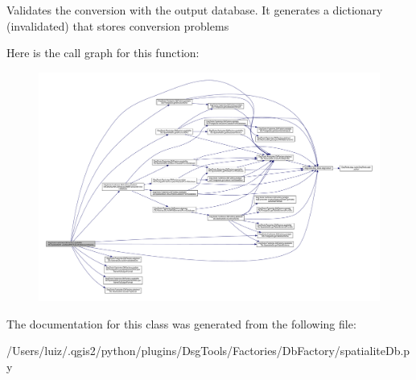 \begin{DoxyVerb}Validates the conversion with the output database.
It generates a dictionary (invalidated) that stores conversion problems
\end{DoxyVerb}
 Here is the call graph for this function\+:
\nopagebreak
\begin{figure}[H]
\begin{center}
\leavevmode
\includegraphics[width=350pt]{class_dsg_tools_1_1_factories_1_1_db_factory_1_1spatialite_db_1_1_spatialite_db_ae6063c531bf964bc1ffb392c2324fa89_cgraph}
\end{center}
\end{figure}


The documentation for this class was generated from the following file\+:\begin{DoxyCompactItemize}
\item 
/\+Users/luiz/.\+qgis2/python/plugins/\+Dsg\+Tools/\+Factories/\+Db\+Factory/spatialite\+Db.\+py\end{DoxyCompactItemize}
